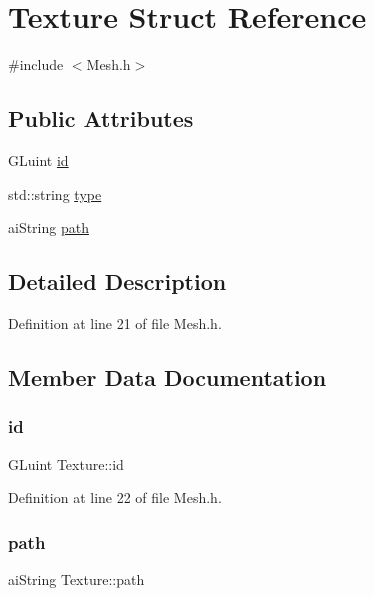 \hypertarget{structTexture}{}\section{Texture Struct Reference}
\label{structTexture}


{\ttfamily \#include $<$Mesh.\+h$>$}

\subsection*{Public Attributes}
\begin{DoxyCompactItemize}
\item 
G\+Luint \mbox{\hyperlink{structTexture_af848138d72c1fc995ab414a71ab10d47}{id}}
\item 
std\+::string \mbox{\hyperlink{structTexture_a916a835d009806f2a57546c7705942b1}{type}}
\item 
ai\+String \mbox{\hyperlink{structTexture_a88893bf81a4d4529c70da39f07f53ddb}{path}}
\end{DoxyCompactItemize}


\subsection{Detailed Description}


Definition at line 21 of file Mesh.\+h.



\subsection{Member Data Documentation}
\mbox{\label{structTexture_af848138d72c1fc995ab414a71ab10d47}} 
\subsubsection{\texorpdfstring{id}{id}}
{\footnotesize\ttfamily G\+Luint Texture\+::id}



Definition at line 22 of file Mesh.\+h.

\mbox{\label{structTexture_a88893bf81a4d4529c70da39f07f53ddb}} 
\subsubsection{\texorpdfstring{path}{path}}
{\footnotesize\ttfamily ai\+String Texture\+::path}



